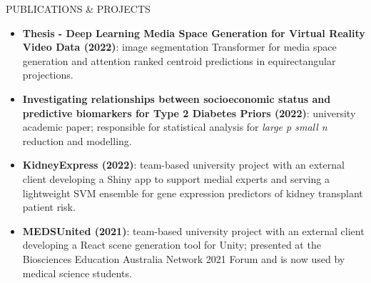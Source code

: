 
\begin{ResumeSection}{PUBLICATIONS \& PROJECTS}
    \small
    \begin{itemize}
        \item \textbf{Thesis - Deep Learning Media Space Generation for Virtual Reality Video Data (2022)}: image segmentation Transformer for media space generation and attention ranked centroid predictions in equirectangular projections.\vspace{-0.25em}
        \item \textbf{Investigating relationships between socioeconomic status and predictive biomarkers for Type 2 Diabetes Priors (2022)}: university academic paper; responsible for statistical analysis for \textit{large p small n} reduction and modelling.\vspace{-0.25em}
        \item \textbf{KidneyExpress (2022)}: team-based university project with an external client developing a Shiny app to support medial experts and serving a lightweight SVM ensemble for gene expression predictors of kidney transplant patient risk.\vspace{-0.25em}
        \item \textbf{MEDSUnited (2021)}: team-based university project with an external client developing a React scene generation tool for Unity; presented at the Biosciences Education Australia Network 2021 Forum and is now used by medical science students.
    \end{itemize}
    \normalsize
\end{ResumeSection} 
